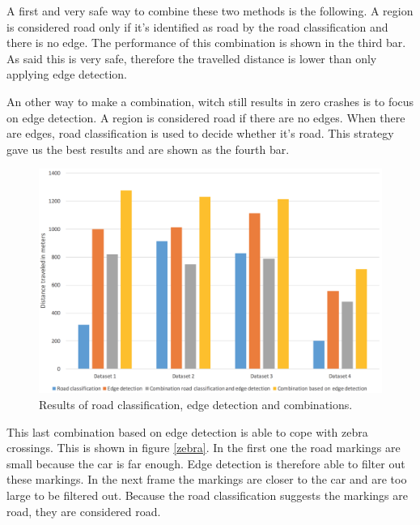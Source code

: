 \documentclass[runningheads,a4paper]{llncs}
\begin{document}
A first and very safe way to combine these two methods is the following. A region is considered road only if it's identified as road by the road classification and there is no edge. The performance of this combination is shown in the third bar. As said this is very safe, therefore the travelled distance is lower than only applying edge detection. 

An other way to make a combination, witch still results in zero crashes is to focus on edge detection. A region is considered road if there are no edges. When there are edges, road classification is used to decide whether it's road. This strategy gave us the best results and are shown as the fourth bar.
\begin{figure}[ht]
	\centering
	\includegraphics[width=\textwidth]{fig/distance_result.png}
	\caption{Results of road classification, edge detection and combinations.\label{distance_result}}
\end{figure}

This last combination based on edge detection is able to cope with zebra crossings. This is shown in figure \ref{zebra}. In the first one the road markings are small because the car is far enough. Edge detection is therefore able to filter out these markings. In the next frame the markings are closer to the car and are too large to be filtered out. Because the road classification suggests the markings are road, they are considered road.
\end{document}
